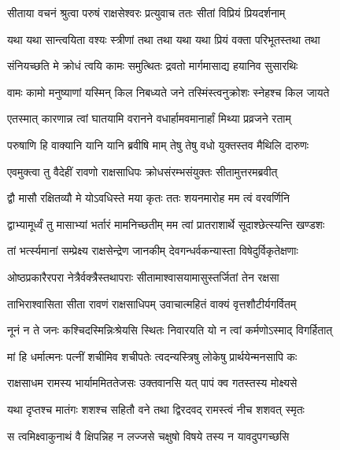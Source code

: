 
\twolineshloka
{सीताया वचनं श्रुत्वा परुषं राक्षसेश्वरः}
{प्रत्युवाच ततः सीतां विप्रियं प्रियदर्शनाम्} %

\twolineshloka
{यथा यथा सान्त्वयिता वश्यः स्त्रीणां तथा तथा}
{यथा यथा प्रियं वक्ता परिभूतस्तथा तथा} %

\twolineshloka
{संनियच्छति मे क्रोधं त्वयि कामः समुत्थितः}
{द्रवतो मार्गमासाद्य हयानिव सुसारथिः} %

\twolineshloka
{वामः कामो मनुष्याणां यस्मिन् किल निबध्यते}
{जने तस्मिंस्त्वनुक्रोशः स्नेहश्च किल जायते} %

\twolineshloka
{एतस्मात् कारणान्न त्वां घातयामि वरानने}
{वधार्हामवमानार्हां मिथ्या प्रव्रजने रताम्} %

\twolineshloka
{परुषाणि हि वाक्यानि यानि यानि ब्रवीषि माम्}
{तेषु तेषु वधो युक्तस्तव मैथिलि दारुणः} %

\twolineshloka
{एवमुक्त्वा तु वैदेहीं रावणो राक्षसाधिपः}
{क्रोधसंरम्भसंयुक्तः सीतामुत्तरमब्रवीत्} %

\twolineshloka
{द्वौ मासौ रक्षितव्यौ मे योऽवधिस्ते मया कृतः}
{ततः शयनमारोह मम त्वं वरवर्णिनि} %

\twolineshloka
{द्वाभ्यामूर्ध्वं तु मासाभ्यां भर्तारं मामनिच्छतीम्}
{मम त्वां प्रातराशार्थे सूदाश्छेत्स्यन्ति खण्डशः} %

\twolineshloka
{तां भर्त्स्यमानां सम्प्रेक्ष्य राक्षसेन्द्रेण जानकीम्}
{देवगन्धर्वकन्यास्ता विषेदुर्विकृतेक्षणाः} %

\twolineshloka
{ओष्ठप्रकारैरपरा नेत्रैर्वक्त्रैस्तथापराः}
{सीतामाश्वासयामासुस्तर्जितां तेन रक्षसा} %

\twolineshloka
{ताभिराश्वासिता सीता रावणं राक्षसाधिपम्}
{उवाचात्महितं वाक्यं वृत्तशौटीर्यगर्वितम्} %

\twolineshloka
{नूनं न ते जनः कश्चिदस्मिन्निःश्रेयसि स्थितः}
{निवारयति यो न त्वां कर्मणोऽस्माद् विगर्हितात्} %

\twolineshloka
{मां हि धर्मात्मनः पत्नीं शचीमिव शचीपतेः}
{त्वदन्यस्त्रिषु लोकेषु प्रार्थयेन्मनसापि कः} %

\twolineshloka
{राक्षसाधम रामस्य भार्याममिततेजसः}
{उक्तवानसि यत् पापं क्व गतस्तस्य मोक्ष्यसे} %

\twolineshloka
{यथा दृप्तश्च मातंगः शशश्च सहितौ वने}
{तथा द्विरदवद् रामस्त्वं नीच शशवत् स्मृतः} %

\twolineshloka
{स त्वमिक्ष्वाकुनाथं वै क्षिपन्निह न लज्जसे}
{चक्षुषो विषये तस्य न यावदुपगच्छसि} %

